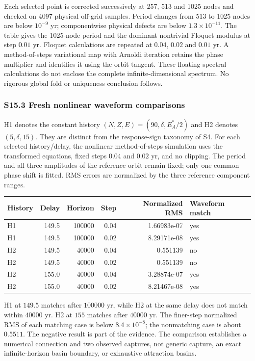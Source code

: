 \documentclass[
  10pt,
  a4paper,
]{article}
\begin{document}
Each selected point is corrected successively at 257, 513 and 1025 nodes
and checked on 4097 physical off-grid samples. Period changes from 513
to 1025 nodes are below \(10^{-9}\) yr; componentwise physical defects
are below \(1.3\times10^{-11}\). The table gives the 1025-node period
and the dominant nontrivial Floquet modulus at step \(0.01\) yr. Floquet
calculations are repeated at \(0.04\), \(0.02\) and \(0.01\) yr. A
method-of-steps variational map with Arnoldi iteration retains the phase
multiplier and identifies it using the orbit tangent. These floating
spectral calculations do not enclose the complete infinite-dimensional
spectrum. No rigorous global fold or uniqueness conclusion follows.

\subsubsection{S15.3 Fresh nonlinear waveform
comparisons}\label{s15.3-fresh-nonlinear-waveform-comparisons}

H1 denotes the constant history \((N,Z,E)=(90,\delta,E_A^*/2)\) and H2
denotes \((5,\delta,15)\). They are distinct from the response-sign
taxonomy of S4. For each selected history/delay, the nonlinear
method-of-steps simulation uses the transformed equations, fixed steps
\(0.04\) and \(0.02\) yr, and no clipping. The period and all three
amplitudes of the reference orbit remain fixed; only one common phase
shift is fitted. RMS errors are normalized by the three reference
component ranges.

\begin{longtable}[]{@{}lrrrrl@{}}
\toprule\noalign{}
History & Delay & Horizon & Step & Normalized RMS & Waveform match \\
\midrule\noalign{}
\endhead
\bottomrule\noalign{}
\endlastfoot
H1 & 149.5 & 100000 & 0.04 & 1.66983e-07 & yes \\
H1 & 149.5 & 100000 & 0.02 & 8.29171e-08 & yes \\
H2 & 149.5 & 40000 & 0.04 & 0.551139 & no \\
H2 & 149.5 & 40000 & 0.02 & 0.551139 & no \\
H2 & 155.0 & 40000 & 0.04 & 3.28874e-07 & yes \\
H2 & 155.0 & 40000 & 0.02 & 8.21467e-08 & yes \\
\end{longtable}

H1 at \(149.5\) matches after \(100000\) yr, while H2 at the same delay
does not match within \(40000\) yr. H2 at \(155\) matches after
\(40000\) yr. The finer-step normalized RMS of each matching case is
below \(8.4\times10^{-8}\); the nonmatching case is about \(0.5511\).
The negative result is part of the evidence. The comparison establishes
a numerical connection and two observed captures, not generic capture,
an exact infinite-horizon basin boundary, or exhaustive attraction
basins.
\end{document}
